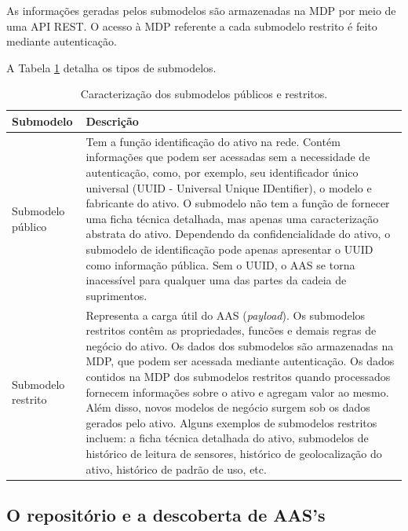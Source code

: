 \documentclass[
	12pt,				%
	oneside,			%
	a4paper,			%
	english,			%
	brazil				%
]{abntex2}
\begin{document}
	As informações geradas pelos submodelos são armazenadas na MDP por meio de uma API REST. O acesso à MDP referente a cada submodelo restrito é feito mediante autenticação.
	
	A Tabela \ref{tab:submodelos-publicos-restritos} detalha os tipos de submodelos.
	
	
		\begin{table}[H]
		\centering
		\caption{Caracterização dos submodelos públicos e restritos.}
		\begin{tabular}{|p{1.3in}|p{4in}|}
			
			\hline
			\textbf{Submodelo}
			&\textbf{Descrição} \\
			
			\hline
			Submodelo público
			& Tem a função identificação do ativo na rede. Contém informações que podem ser acessadas sem a necessidade de autenticação, como, por exemplo, seu identificador único universal (UUID - Universal Unique IDentifier), o modelo e fabricante do ativo. O submodelo não tem a função de fornecer uma ficha técnica detalhada, mas apenas uma caracterização abstrata do ativo. Dependendo da confidencialidade do ativo, o submodelo de identificação pode apenas apresentar o UUID como informação pública. Sem o UUID, o AAS se torna inacessível para qualquer uma das partes da cadeia de suprimentos. \\
			
			\hline
			Submodelo restrito
			& Representa a carga útil do AAS (\textit{payload}). Os submodelos restritos contêm as propriedades, funcões e demais regras de negócio do ativo. Os dados dos submodelos são armazenadas na MDP, que podem ser acessada mediante autenticação. Os dados contidos na MDP dos submodelos restritos quando processados fornecem informações sobre o ativo e agregam valor ao mesmo. Além disso, novos modelos de negócio surgem sob os dados gerados pelo ativo. Alguns exemplos de submodelos restritos incluem: a ficha técnica detalhada do ativo, submodelos de histórico de leitura de sensores, histórico de geolocalização do ativo, histórico de padrão de uso, etc.\\
			
		
			\hline
			
		\end{tabular}
		\label{tab:submodelos-publicos-restritos}
	\end{table}
	
	\subsection{O repositório e a descoberta de AAS's}
	
\end{document}

